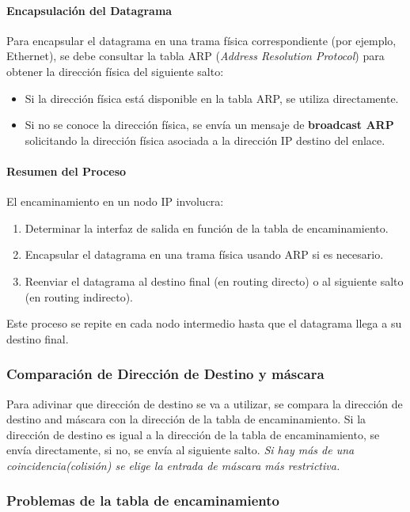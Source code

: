 \documentclass[a4paper,12pt]{article}
\begin{document}
\paragraph{Encapsulación del Datagrama}
Para encapsular el datagrama en una trama física correspondiente (por ejemplo, Ethernet), se debe consultar la tabla ARP (\textit{Address Resolution Protocol}) para obtener la dirección física del siguiente salto:
\begin{itemize}
    \item Si la dirección física está disponible en la tabla ARP, se utiliza directamente.
    \item Si no se conoce la dirección física, se envía un mensaje de \textbf{broadcast ARP} solicitando la dirección física asociada a la dirección IP destino del enlace.
\end{itemize}

\paragraph{Resumen del Proceso}
El encaminamiento en un nodo IP involucra:
\begin{enumerate}
    \item Determinar la interfaz de salida en función de la tabla de encaminamiento.
    \item Encapsular el datagrama en una trama física usando ARP si es necesario.
    \item Reenviar el datagrama al destino final (en routing directo) o al siguiente salto (en routing indirecto).
\end{enumerate}
Este proceso se repite en cada nodo intermedio hasta que el datagrama llega a su destino final.

\subsubsection*{Comparación de Dirección de Destino y máscara}

Para adivinar que dirección de destino se va a utilizar, se compara la dirección de destino and máscara con la dirección de la tabla de encaminamiento. Si la dirección de destino es igual a la dirección de la tabla de encaminamiento, se envía directamente, si no, se envía al siguiente salto. \textit{Si hay más de una coincidencia(colisión) se elige la entrada de máscara más restrictiva.}

\subsubsection*{Problemas de la tabla de encaminamiento}
\end{document}
